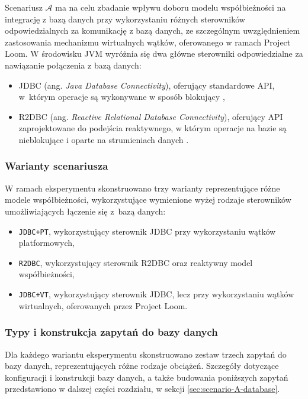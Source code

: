Scenariusz $\mathcal{A}$ ma na celu zbadanie wpływu doboru modelu współbieżności na integrację z bazą danych przy wykorzystaniu różnych sterowników odpowiedzialnych za komunikację z bazą danych, ze szczególnym uwzględnieniem zastosowania mechanizmu wirtualnych wątków, oferowanego w ramach Project Loom.
W środowisku JVM wyróżnia się dwa główne sterowniki odpowiedzialne za nawiązanie połączenia z bazą danych:
\begin{itemize}
    \itemsep0em
    \item JDBC (ang. \emph{Java Database Connectivity}), oferujący standardowe API, w~którym operacje są wykonywane w sposób blokujący \cite{jdbc-documentation},
    \item R2DBC (ang. \emph{Reactive Relational Database Connectivity}), oferujący API zaprojektowane do podejścia reaktywnego, w którym operacje na bazie są nieblokujące i oparte na strumieniach danych \cite{r2dbc-documentation}.
\end{itemize}


\subsubsection{Warianty scenariusza}
W ramach eksperymentu skonstruowano trzy warianty reprezentujące różne modele współbieżności, wykorzystujące wymienione wyżej rodzaje sterowników umożliwiających łączenie się z~bazą danych:
\begin{itemize}
    \itemsep0em
    \item \texttt{JDBC+PT}, wykorzystujący sterownik JDBC przy wykorzystaniu wątków platformowych,
    \item \texttt{R2DBC}, wykorzystujący sterownik R2DBC oraz reaktywny model współbieżności,
    \item \texttt{JDBC+VT}, wykorzystujący sterownik JDBC, lecz przy wykorzystaniu wątków wirtualnych, oferowanych przez Project Loom.
\end{itemize}


\subsubsection{Typy i konstrukcja zapytań do bazy danych}
Dla każdego wariantu eksperymentu skonstruowano zestaw trzech zapytań do bazy danych, reprezentujących różne rodzaje obciążeń. Szczegóły dotyczące konfiguracji i konstrukcji bazy danych, a także budowania poniższych zapytań przedstawiono w dalszej części rozdziału, w sekcji \ref{sec:scenario-A-database}.

